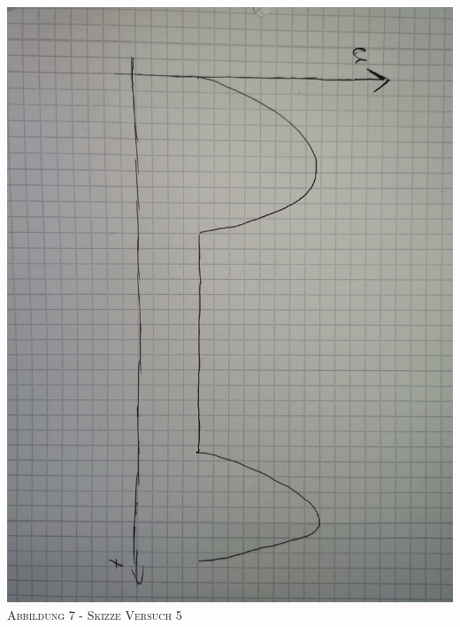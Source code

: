 \documentclass[11pt]{article}
\begin{document}
\newpage
\begin{center}
\includegraphics[scale=0.1]{5.jpg}\\
\small \textsc{Abbildung 7 - Skizze Versuch 5}\\

\end{center}
\end{document}
